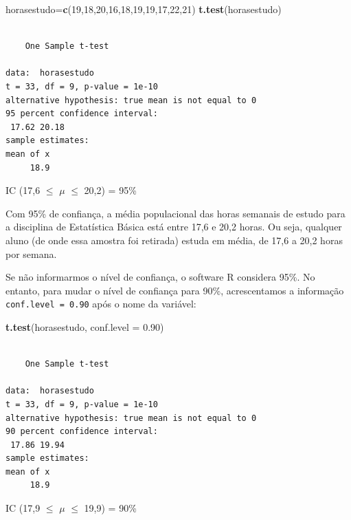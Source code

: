 \documentclass[12pt,brazil,oneside]{book}
\newenvironment{Shaded}{\begin{snugshade}}{\end{snugshade}}
\newcommand{\DataTypeTok}[1]{\textcolor[rgb]{0.13,0.29,0.53}{#1}}
\newcommand{\DecValTok}[1]{\textcolor[rgb]{0.00,0.00,0.81}{#1}}
\newcommand{\FloatTok}[1]{\textcolor[rgb]{0.00,0.00,0.81}{#1}}
\newcommand{\KeywordTok}[1]{\textcolor[rgb]{0.13,0.29,0.53}{\textbf{#1}}}
\newcommand{\NormalTok}[1]{#1}
\begin{document}
\begin{Shaded}
\begin{Highlighting}[]
\NormalTok{horasestudo=}\KeywordTok{c}\NormalTok{(}\DecValTok{19}\NormalTok{,}\DecValTok{18}\NormalTok{,}\DecValTok{20}\NormalTok{,}\DecValTok{16}\NormalTok{,}\DecValTok{18}\NormalTok{,}\DecValTok{19}\NormalTok{,}\DecValTok{19}\NormalTok{,}\DecValTok{17}\NormalTok{,}\DecValTok{22}\NormalTok{,}\DecValTok{21}\NormalTok{)}
\KeywordTok{t.test}\NormalTok{(horasestudo)}
\end{Highlighting}
\end{Shaded}

\begin{verbatim}

    One Sample t-test

data:  horasestudo
t = 33, df = 9, p-value = 1e-10
alternative hypothesis: true mean is not equal to 0
95 percent confidence interval:
 17.62 20.18
sample estimates:
mean of x 
     18.9 
\end{verbatim}

IC (17,6 \(\leq\) \(\mu\) \(\leq\) 20,2) = 95\%

Com 95\% de confiança, a média populacional das horas semanais de estudo para a disciplina de Estatística Básica está entre 17,6 e 20,2 horas. Ou seja, qualquer aluno (de onde essa amostra foi retirada) estuda em média, de 17,6 a 20,2 horas por semana.

Se não informarmos o nível de confiança, o software R considera 95\%. No entanto, para mudar o nível de confiança para 90\%, acrescentamos a informação \texttt{conf.level\ =\ 0.90} após o nome da variável:

\begin{Shaded}
\begin{Highlighting}[]
\KeywordTok{t.test}\NormalTok{(horasestudo, }\DataTypeTok{conf.level =} \FloatTok{0.90}\NormalTok{)}
\end{Highlighting}
\end{Shaded}

\begin{verbatim}

    One Sample t-test

data:  horasestudo
t = 33, df = 9, p-value = 1e-10
alternative hypothesis: true mean is not equal to 0
90 percent confidence interval:
 17.86 19.94
sample estimates:
mean of x 
     18.9 
\end{verbatim}

IC (17,9 \(\leq\) \(\mu\) \(\leq\) 19,9) = 90\%
\end{document}
